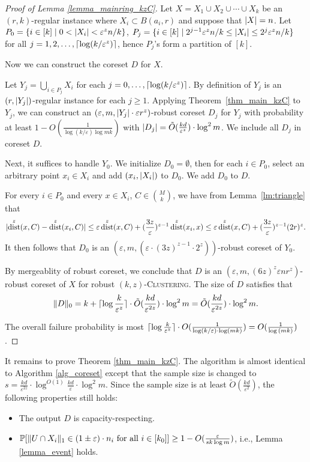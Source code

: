 \documentclass[11pt,letterpaper]{article}
\theoremstyle{definition}
\newcommand{\eps}{\varepsilon}
\renewcommand{\epsilon}{\varepsilon}
\newcommand{\ProblemName}[1]{\textsc{#1}}
\newcommand{\kzC}{\ProblemName{$(k, z)$-Clustering}\xspace}
\DeclareMathOperator{\dist}{dist}
\DeclarePairedDelimiter{\abs}{\lvert}{\rvert}
\DeclarePairedDelimiter{\norm}{\lVert}{\rVert}
\DeclarePairedDelimiter{\ceil}{\lceil}{\rceil}
\begin{document}
\begin{proof}[Proof of Lemma \ref{lemma_mainring_kzC}]

%
Let $X=X_1\cup X_2\cup \cdots \cup X_k$ be an $(r,k)$-regular instance where $X_i\subset B(a_i,r)$ and suppose that $\abs{X}=n$. Let $P_0=\{i\in [k]\mid 0<\abs{X_i} <\eps^z n/k\}$, $P_j=\{i\in [k]\mid 2^{j-1}\eps^z n/k \leq \abs{X_i} \leq 2^j \eps^z n/k    \}$ for all $j=1,2, \dots ,\ceil{\log(k/\eps^z)}$,  hence $P_j$'s form a partition of $[k]$.

%
Now we can construct the coreset $D$ for $X$. 

%
Let $Y_j=\bigcup_{i\in P_j} X_i$ for each $j=0, \dots, \ceil{\log(k/\eps^z)}$. By definition of $Y_j$ is an $(r,\abs{Y_j})$-regular instance for each $j\geq 1$. Applying Theorem~\ref{thm_main_kzC} to $Y_j$, we can construct an $(\eps,m,\abs{Y_j}\cdot \eps r^z)$-robust coreset $D_j$ for $Y_j$ with probability at least $1-O(\frac{1}{\log(k/\eps)\log{mk}})$ with $\abs{D_j}=\tilde{O}(\frac{kd}{\eps^z})\cdot \log^2{m}$. We include all $D_j$ in coreset $D$.

%
Next, it suffices to handle $Y_0$. We initialize $D_0 = \emptyset$, then for each $i\in P_0$, select an arbitrary point $x_i\in X_i$ and add $(x_i,\abs{X_i})$ to $D_0$. We add $D_0$ to $D$.

%
For every $i\in P_0$ and every $x \in X_i$, $C\in \binom{M}{k}$, we have from Lemma~\ref{lm:triangle} that
\begin{align*}
    \abs{\dist^z(x,C)-\dist^z(x_i,C)} \leq \eps \dist^z(x,C) + (\frac{3z}{\eps})^{z-1} \dist^z(x_i,x) 
    \leq \eps \dist^z(x,C) + (\frac{3z}{\eps})^{z-1}(2r)^z.
\end{align*}
It then follows that $D_0$ is an $(\eps,m,(\eps\cdot (3z)^{z-1}\cdot 2^{z}))$-robust coreset of $Y_0$.


%
By mergeablity of robust coreset, we conclude that $D$ is an $(\eps,m, (6z)^z\eps n r^z)$-robust coreset of $X$ for robust \kzC. The size of $D$ satisfies that
\[
    \norm{D}_0=k+\ceil{\log{\frac{k}{\eps^z}}}\cdot \tilde{O}(\frac{kd}{\eps^{2z}})\cdot \log ^2 m =\tilde{O}(\frac{kd}{\eps^{2z}})\cdot \log ^2 m.
\]


%
The overall failure probability is most $\ceil{\log{\frac{k}{\eps^z}}}\cdot O(\frac{1}{\log(k/\eps)\cdot \log(mk)}) =O(\frac{1}{\log {(mk)}})$. 
\end{proof}

It remains to prove Theorem \ref{thm_main_kzC}.
%
The algorithm is almost identical to Algorithm \ref{alg_coreset} except that the sample size is changed to $s = \frac{kd}{\eps^{2z}}\cdot \log^{O(1)} \frac{kd}{\eps}\cdot \log^2 m$.
%
Since the sample size is at least $\tilde{O}(\frac{kd}{\eps^2})$, the following properties still holds:
%
\begin{itemize}[itemsep=0pt]
\item The output $D$ is capacity-respecting.
%
\item $\mathbb{P}[\text{$\norm{U\cap X_i}_1 \in (1\pm \eps)\cdot n_i$ for all $i\in [k_0]$}]\geq 1 - O(\frac{\epsilon}{sk\log m})$, i.e., Lemma \ref{lemma_event} holds.
\end{itemize}
%
\end{document}
